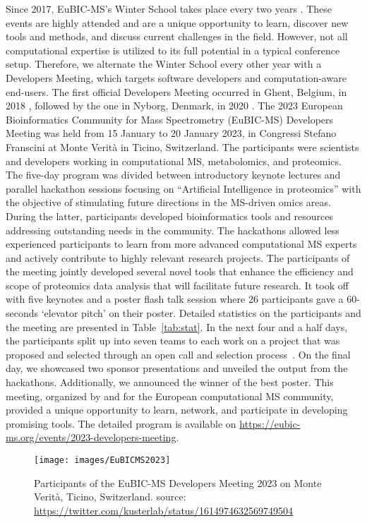 Since 2017, EuBIC-MS's Winter School takes place every two years \citep{pmid28385664}. These events are highly attended and are a unique opportunity to learn, discover new tools and methods, and discuss current challenges in the field. However, not all computational expertise is utilized to its full potential in a typical conference setup. Therefore, we alternate the Winter School every other year with a Developers Meeting, which targets software developers and computation-aware end-users. The first official Developers Meeting occurred in Ghent, Belgium, in 2018 \citep{pmid29864591}, followed by the one in Nyborg, Denmark, in 2020 \citep{EuBIC-MS2020}.
The 2023 European Bioinformatics Community for Mass Spectrometry (EuBIC-MS) Developers Meeting was held from 15 January to 20 January 2023, in Congressi Stefano Franscini at Monte Verità in Ticino, Switzerland. The participants were scientists and developers working in computational MS, metabolomics, and proteomics. The five-day program was divided between introductory keynote lectures and parallel hackathon sessions focusing on ``Artificial Intelligence in proteomics'' with the objective of stimulating future directions in the MS-driven omics areas. During the latter, participants developed bioinformatics tools and resources addressing outstanding needs in the community. The hackathons allowed less experienced participants to learn from more advanced computational MS experts and actively contribute to highly relevant research projects. The participants of the meeting jointly developed several novel tools that enhance the efficiency and scope of proteomics data analysis that will facilitate future research.
It took off with five keynotes and a poster flash talk session where 26 participants gave a 60-seconds `elevator pitch' on their poster. Detailed statistics on the participants and the meeting are presented in Table~\ref{tab:stat}. In the next four and a half days, the participants split up into seven teams to each work on a project that was proposed and selected through an open call and selection process~\citep{EuBIC2023GitHub}. On the final day, we showcased two sponsor presentations and unveiled the output from the hackathons. Additionally, we announced the winner of the best poster. This meeting, organized by and for the European computational MS community, provided a unique opportunity to learn, network, and participate in developing promising tools. The detailed program is available on \url{https://eubic-ms.org/events/2023-developers-meeting}.

\begin{figure*}[ht]
\centering
\texttt{[image: images/EuBICMS2023]}
\caption{Participants of the EuBIC-MS Developers Meeting 2023 on Monte Verità, Ticino, Switzerland. source: \url{https://twitter.com/kusterlab/status/1614974632569749504}}
\end{figure*}

